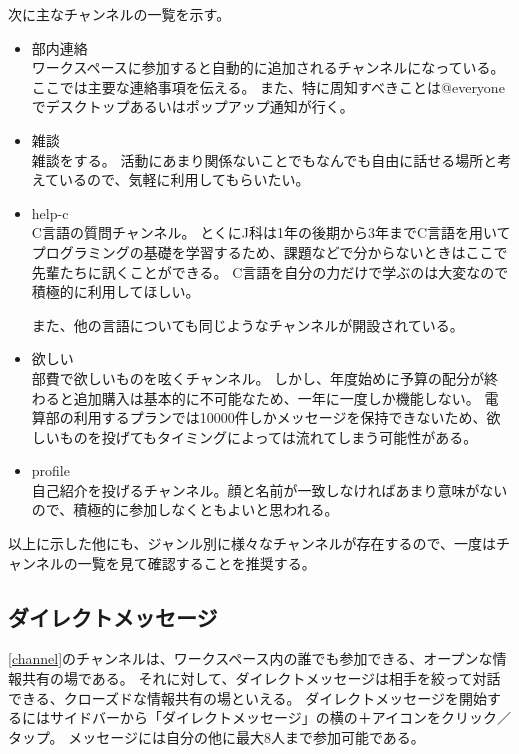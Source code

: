 \documentclass[lualatex,ja=standard,12pt,a4j]{bxjsbook}
\begin{document}
            	次に主なチャンネルの一覧を示す。
            
            	\begin{itemize}
            		\item 部内連絡\\
                        ワークスペースに参加すると自動的に追加されるチャンネルになっている。
                        ここでは主要な連絡事項を伝える。
                        また、特に周知すべきことは@everyoneでデスクトップあるいはポップアップ通知が行く。
                	\item 雑談\\
                    	雑談をする。
                        活動にあまり関係ないことでもなんでも自由に話せる場所と考えているので、気軽に利用してもらいたい。
                    \item help-c\\
                    	C言語の質問チャンネル。
                        とくにJ科は1年の後期から3年までC言語を用いてプログラミングの基礎を学習するため、課題などで分からないときはここで先輩たちに訊くことができる。
                        C言語を自分の力だけで学ぶのは大変なので積極的に利用してほしい。
                        
                        また、他の言語についても同じようなチャンネルが開設されている。
                    \item 欲しい\\
                    	部費で欲しいものを呟くチャンネル。
                        しかし、年度始めに予算の配分が終わると追加購入は基本的に不可能なため、一年に一度しか機能しない。
                        電算部の利用するプランでは10000件しかメッセージを保持できないため、欲しいものを投げてもタイミングによっては流れてしまう可能性がある。
                    \item profile\\
                    	自己紹介を投げるチャンネル。顔と名前が一致しなければあまり意味がないので、積極的に参加しなくともよいと思われる。
            	\end{itemize}
            
            	以上に示した他にも、ジャンル別に様々なチャンネルが存在するので、一度はチャンネルの一覧を見て確認することを推奨する。
                
   			\subsection{ダイレクトメッセージ\label{directmessage}}
            	\ref{channel}のチャンネルは、ワークスペース内の誰でも参加できる、オープンな情報共有の場である。
                それに対して、ダイレクトメッセージは相手を絞って対話できる、クローズドな情報共有の場といえる。
                ダイレクトメッセージを開始するにはサイドバーから「ダイレクトメッセージ」の横の＋アイコンをクリック／タップ。
                メッセージには自分の他に最大8人まで参加可能である。
            
\end{document}
